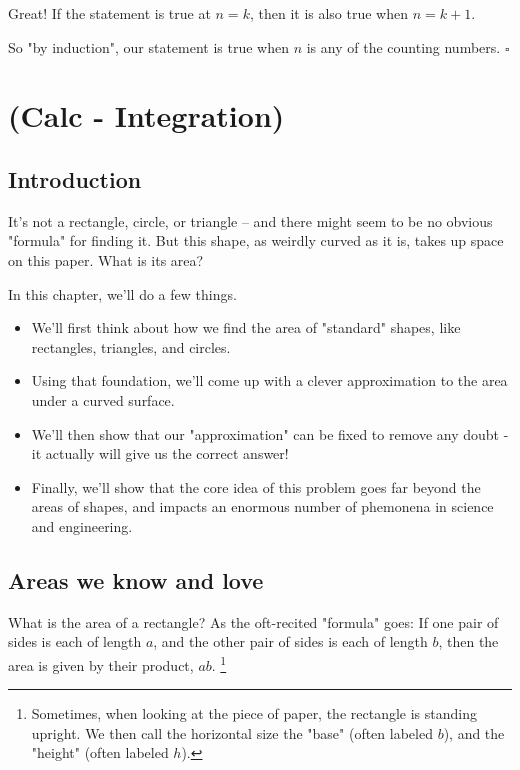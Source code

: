 \documentclass{book}
\begin{document}
Great! If the statement is true at $n = k$, then it is also true when $n = k + 1$. 

So "by induction", our statement is true when $n$ is any of the counting numbers. $\square$



\chapter{(Calc - Integration)}

\section{Introduction}

It's not a rectangle, circle, or triangle -- and there might seem to be no obvious "formula" for finding it. But this shape, as weirdly curved as it is, takes up space on this paper. What is its area? 


In this chapter, we'll do a few things. 

\begin{itemize}
\item We'll first think about how we find the area of "standard" shapes, like rectangles, triangles, and circles.
\item Using that foundation, we'll come up with a clever approximation to the area under a curved surface. 
\item We'll then show that our "approximation" can be fixed to remove any doubt - it actually will give us the correct answer!
\item Finally, we'll show that the core idea of this problem goes far beyond the areas of shapes, and impacts an enormous number of phemonena in science and engineering.
\end{itemize}


\section{Areas we know and love}

What is the area of a rectangle? As the oft-recited "formula" goes: If one pair of sides is each of length $a$, and the other pair of sides is each of length $b$, then the area is given by their product, $ab$. \footnote{Sometimes, when looking at the piece of paper, the rectangle is standing upright. We then call the horizontal size the "base" (often labeled $b$), and the "height" (often labeled $h$).}
\end{document}
